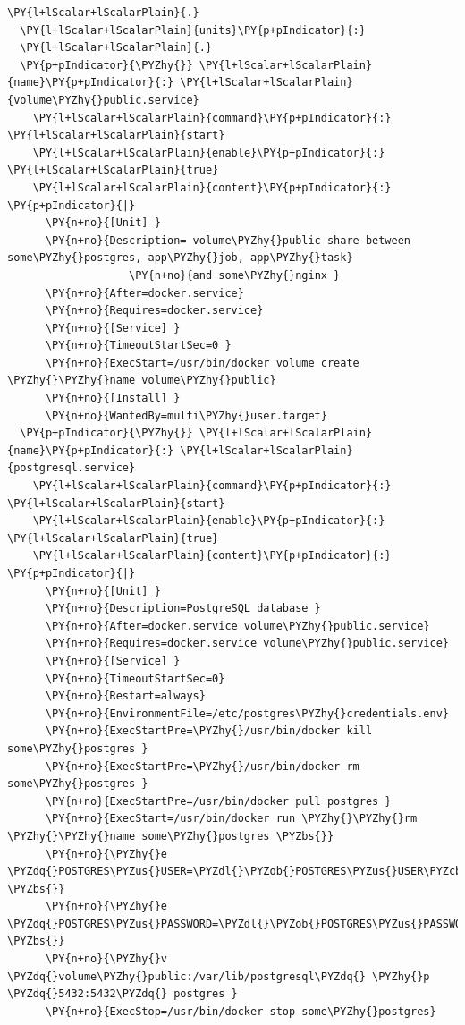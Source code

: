 \begin{codelisting}
\begin{Verbatim}[fontsize=\relsize{-2.5},fontseries=b,commandchars=\\\{\}]
  \PY{l+lScalar+lScalarPlain}{.}
  \PY{l+lScalar+lScalarPlain}{units}\PY{p+pIndicator}{:}
  \PY{l+lScalar+lScalarPlain}{.}
  \PY{p+pIndicator}{\PYZhy{}} \PY{l+lScalar+lScalarPlain}{name}\PY{p+pIndicator}{:} \PY{l+lScalar+lScalarPlain}{volume\PYZhy{}public.service}
    \PY{l+lScalar+lScalarPlain}{command}\PY{p+pIndicator}{:} \PY{l+lScalar+lScalarPlain}{start}
    \PY{l+lScalar+lScalarPlain}{enable}\PY{p+pIndicator}{:} \PY{l+lScalar+lScalarPlain}{true}
    \PY{l+lScalar+lScalarPlain}{content}\PY{p+pIndicator}{:} \PY{p+pIndicator}{|}
      \PY{n+no}{[Unit] }
      \PY{n+no}{Description= volume\PYZhy{}public share between some\PYZhy{}postgres, app\PYZhy{}job, app\PYZhy{}task}
                   \PY{n+no}{and some\PYZhy{}nginx }
      \PY{n+no}{After=docker.service}
      \PY{n+no}{Requires=docker.service}
      \PY{n+no}{[Service] }
      \PY{n+no}{TimeoutStartSec=0 }
      \PY{n+no}{ExecStart=/usr/bin/docker volume create \PYZhy{}\PYZhy{}name volume\PYZhy{}public}
      \PY{n+no}{[Install] }
      \PY{n+no}{WantedBy=multi\PYZhy{}user.target}
  \PY{p+pIndicator}{\PYZhy{}} \PY{l+lScalar+lScalarPlain}{name}\PY{p+pIndicator}{:} \PY{l+lScalar+lScalarPlain}{postgresql.service}
    \PY{l+lScalar+lScalarPlain}{command}\PY{p+pIndicator}{:} \PY{l+lScalar+lScalarPlain}{start}
    \PY{l+lScalar+lScalarPlain}{enable}\PY{p+pIndicator}{:} \PY{l+lScalar+lScalarPlain}{true}
    \PY{l+lScalar+lScalarPlain}{content}\PY{p+pIndicator}{:} \PY{p+pIndicator}{|}
      \PY{n+no}{[Unit] }
      \PY{n+no}{Description=PostgreSQL database }
      \PY{n+no}{After=docker.service volume\PYZhy{}public.service}
      \PY{n+no}{Requires=docker.service volume\PYZhy{}public.service}
      \PY{n+no}{[Service] }
      \PY{n+no}{TimeoutStartSec=0}
      \PY{n+no}{Restart=always}
      \PY{n+no}{EnvironmentFile=/etc/postgres\PYZhy{}credentials.env}
      \PY{n+no}{ExecStartPre=\PYZhy{}/usr/bin/docker kill some\PYZhy{}postgres }
      \PY{n+no}{ExecStartPre=\PYZhy{}/usr/bin/docker rm some\PYZhy{}postgres }
      \PY{n+no}{ExecStartPre=/usr/bin/docker pull postgres }
      \PY{n+no}{ExecStart=/usr/bin/docker run \PYZhy{}\PYZhy{}rm \PYZhy{}\PYZhy{}name some\PYZhy{}postgres \PYZbs{}}
      \PY{n+no}{\PYZhy{}e \PYZdq{}POSTGRES\PYZus{}USER=\PYZdl{}\PYZob{}POSTGRES\PYZus{}USER\PYZcb{}\PYZdq{} \PYZbs{}}
      \PY{n+no}{\PYZhy{}e \PYZdq{}POSTGRES\PYZus{}PASSWORD=\PYZdl{}\PYZob{}POSTGRES\PYZus{}PASSWORD\PYZcb{}\PYZdq{} \PYZbs{}}
      \PY{n+no}{\PYZhy{}v \PYZdq{}volume\PYZhy{}public:/var/lib/postgresql\PYZdq{} \PYZhy{}p \PYZdq{}5432:5432\PYZdq{} postgres }
      \PY{n+no}{ExecStop=/usr/bin/docker stop some\PYZhy{}postgres}

\end{Verbatim}
\end{codelisting}
